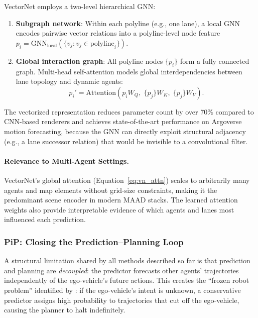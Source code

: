 \documentclass[12pt, a4paper]{article}
\begin{document}
VectorNet employs a two-level hierarchical GNN:
\begin{enumerate}[noitemsep]
  \item \textbf{Subgraph network}: Within each polyline (e.g., one lane), a local
        GNN encodes pairwise vector relations into a polyline-level node feature
        $p_i = \text{GNN}_{\text{local}}(\{v_j : v_j \in \text{polyline}_i\})$.
  \item \textbf{Global interaction graph}: All polyline nodes $\{p_i\}$ form a
        fully connected graph. Multi-head self-attention models global
        interdependencies between lane topology and dynamic agents:
        \begin{equation}
          p_i' = \text{Attention}\!\left( p_i W_Q,\; \{p_j\} W_K,\; \{p_j\} W_V \right).
          \label{eq:vn_attn}
        \end{equation}
\end{enumerate}
The vectorized representation reduces parameter count by over 70\% compared to
CNN-based renderers and achieves state-of-the-art performance on Argoverse motion
forecasting, because the GNN can directly exploit structural adjacency (e.g., a
lane successor relation) that would be invisible to a convolutional filter.

\paragraph{Relevance to Multi-Agent Settings.}
VectorNet's global attention (Equation~\ref{eq:vn_attn}) scales to arbitrarily
many agents and map elements without grid-size constraints, making it the
predominant scene encoder in modern MAAD stacks. The learned attention weights
also provide interpretable evidence of which agents and lanes most influenced
each prediction.

\subsubsection{PiP: Closing the Prediction--Planning Loop}
\label{sec:pip}

A structural limitation shared by all methods described so far is that prediction
and planning are \emph{decoupled}: the predictor forecasts other agents'
trajectories independently of the ego-vehicle's future actions. This creates the
``frozen robot problem'' identified by \citet{song2020pip}: if the ego-vehicle's
intent is unknown, a conservative predictor assigns high probability to trajectories
that cut off the ego-vehicle, causing the planner to halt indefinitely.
\end{document}

